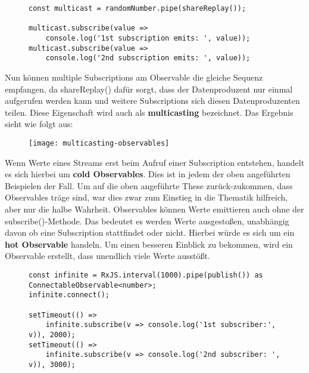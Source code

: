 \begin{figure}[H]
\begin{lstlisting}[basicstyle=\small]
const multicast = randomNumber.pipe(shareReplay());

multicast.subscribe(value =>
    console.log('1st subscription emits: ', value));
multicast.subscribe(value =>
    console.log('2nd subscription emits: ', value));
\end{lstlisting}
\end{figure}

\noindent
Nun können multiple Subscriptions am Observable die gleiche Sequenz empfangen, da shareReplay() dafür sorgt, dass der Datenproduzent nur einmal aufgerufen werden kann und weitere Subscriptions sich diesen Datenproduzenten teilen. Diese Eigenschaft wird auch als \textbf{multicasting} bezeichnet. Das Ergebnis sieht wie folgt aus:

\begin{figure}[H]
\begin{center}
\texttt{[image: multicasting-observables]}
\end{center}
\end{figure}

\noindent
Wenn Werte eines Streams erst beim Aufruf einer Subscription entstehen, handelt es sich hierbei um \textbf{cold Observables}.\cite{hot-vs-cold} Dies ist in jedem der oben angeführten Beispielen der Fall. Um auf die oben angeführte These zurück-zukommen, dass Observables träge sind, war dies zwar zum Einstieg in die Thematik hilfreich, aber nur die halbe Wahrheit. Observables können Werte emittieren auch ohne der subscribe()-Methode. Das bedeutet es werden Werte ausgestoßen, unabhängig davon ob eine Subscription stattfindet oder nicht. Hierbei würde es sich um ein \textbf{hot Observable} handeln. Um einen besseren Einblick zu bekommen, wird ein Observable erstellt, dass unendlich viele Werte ausstößt.

\begin{figure}[H]
\begin{lstlisting}[basicstyle=\small]
const infinite = RxJS.interval(1000).pipe(publish()) as ConnectableObservable<number>;
infinite.connect();

setTimeout(() =>
    infinite.subscribe(v => console.log('1st subscriber:', v)), 2000);
setTimeout(() =>
    infinite.subscribe(v => console.log('2nd subscriber: ', v)), 3000);
\end{lstlisting}
\end{figure}

